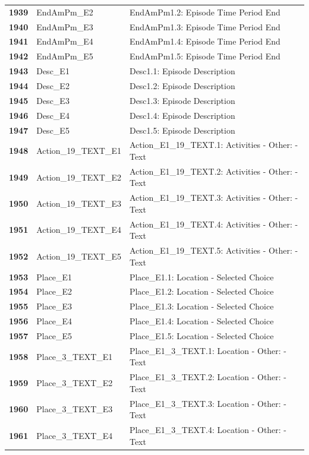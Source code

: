 \documentclass[
  letterpaper,
  DIV=11,
  numbers=noendperiod]{scrartcl}
\begin{document}
\begin{longtable}[t]{>{}cll}
\textbf{1939} & EndAmPm\_E2 & EndAmPm1.2: Episode Time Period End\\
\textbf{1940} & EndAmPm\_E3 & EndAmPm1.3: Episode Time Period End\\
\addlinespace
\textbf{1941} & EndAmPm\_E4 & EndAmPm1.4: Episode Time Period End\\
\textbf{1942} & EndAmPm\_E5 & EndAmPm1.5: Episode Time Period End\\
\textbf{1943} & Desc\_E1 & Desc1.1: Episode Description\\
\textbf{1944} & Desc\_E2 & Desc1.2: Episode Description\\
\textbf{1945} & Desc\_E3 & Desc1.3: Episode Description\\
\addlinespace
\textbf{1946} & Desc\_E4 & Desc1.4: Episode Description\\
\textbf{1947} & Desc\_E5 & Desc1.5: Episode Description\\
\textbf{1948} & Action\_19\_TEXT\_E1 & Action\_E1\_19\_TEXT.1: Activities - Other: - Text\\
\textbf{1949} & Action\_19\_TEXT\_E2 & Action\_E1\_19\_TEXT.2: Activities - Other: - Text\\
\textbf{1950} & Action\_19\_TEXT\_E3 & Action\_E1\_19\_TEXT.3: Activities - Other: - Text\\
\addlinespace
\textbf{1951} & Action\_19\_TEXT\_E4 & Action\_E1\_19\_TEXT.4: Activities - Other: - Text\\
\textbf{1952} & Action\_19\_TEXT\_E5 & Action\_E1\_19\_TEXT.5: Activities - Other: - Text\\
\textbf{1953} & Place\_E1 & Place\_E1.1: Location - Selected Choice\\
\textbf{1954} & Place\_E2 & Place\_E1.2: Location - Selected Choice\\
\textbf{1955} & Place\_E3 & Place\_E1.3: Location - Selected Choice\\
\addlinespace
\textbf{1956} & Place\_E4 & Place\_E1.4: Location - Selected Choice\\
\textbf{1957} & Place\_E5 & Place\_E1.5: Location - Selected Choice\\
\textbf{1958} & Place\_3\_TEXT\_E1 & Place\_E1\_3\_TEXT.1: Location - Other: - Text\\
\textbf{1959} & Place\_3\_TEXT\_E2 & Place\_E1\_3\_TEXT.2: Location - Other: - Text\\
\textbf{1960} & Place\_3\_TEXT\_E3 & Place\_E1\_3\_TEXT.3: Location - Other: - Text\\
\addlinespace
\textbf{1961} & Place\_3\_TEXT\_E4 & Place\_E1\_3\_TEXT.4: Location - Other: - Text\\

\end{longtable}
\end{document}

